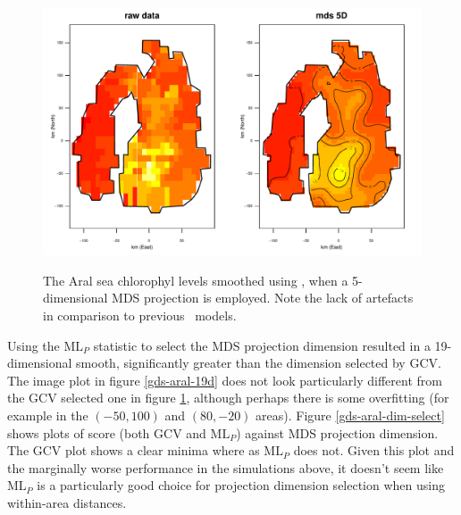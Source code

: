 \begin{figure}
\centering
\includegraphics[width=6in]{mds/figs/aral-5d-duchon.pdf} \\
\caption{The Aral sea chlorophyl levels smoothed using \mdsds, when a 5-dimensional MDS projection is employed. Note the lack of artefacts in comparison to previous \mdsap\ models.}
\label{mds-aral-5d-duchon}
\end{figure}

Using the $\text{ML}_P$ statistic to select the MDS projection dimension resulted in a 19-dimensional smooth, significantly greater than the dimension selected by GCV. The image plot in figure \ref{gds-aral-19d} does not look particularly different from the GCV selected one in figure \ref{mds-aral-5d-duchon}, although perhaps there is some overfitting (for example in the $(-50,100)$ and $(80,-20)$ areas). Figure \ref{gds-aral-dim-select} shows plots of score (both GCV and $\text{ML}_P$) against MDS projection dimension. The GCV plot shows a clear minima where as $\text{ML}_P$ does not. Given this plot and the marginally worse performance in the simulations above, it doesn't seem like $\text{ML}_P$ is a particularly good choice for projection dimension selection when using within-area distances.

